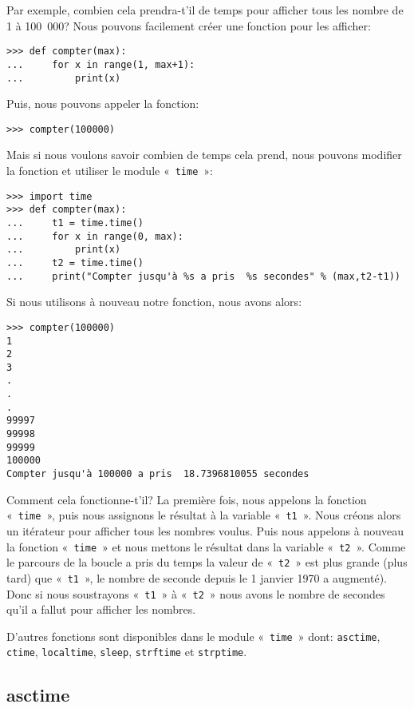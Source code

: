 Par exemple, combien cela prendra-t'il de temps pour afficher tous les nombre de 1 à 100 000?  Nous pouvons facilement créer une fonction pour les afficher:
\begin{Verbatim}[frame=single,rulecolor=\color{gray}]
>>> def compter(max):
...     for x in range(1, max+1):
...         print(x)
\end{Verbatim}

Puis, nous pouvons appeler la fonction:
\begin{Verbatim}[frame=single,rulecolor=\color{gray}]
>>> compter(100000)
\end{Verbatim}

Mais si nous voulons savoir combien de temps cela prend, nous pouvons modifier la fonction et utiliser le module  « \texttt{time} »:

\begin{Verbatim}[frame=single,rulecolor=\color{gray}]
>>> import time
>>> def compter(max):
...     t1 = time.time()
...     for x in range(0, max):
...         print(x)
...     t2 = time.time()
...     print("Compter jusqu'à %s a pris  %s secondes" % (max,t2-t1))
\end{Verbatim}

Si nous utilisons à nouveau notre fonction, nous avons alors:

\begin{Verbatim}[frame=single,rulecolor=\color{gray}]
>>> compter(100000)
1
2
3
.
.
.
99997
99998
99999
100000
Compter jusqu'à 100000 a pris  18.7396810055 secondes
\end{Verbatim}

Comment cela fonctionne-t'il? La première fois, nous appelons la fonction « \texttt{time} », puis nous assignons le résultat à la variable « \texttt{t1} ». Nous créons alors un itérateur pour afficher tous les nombres voulus. Puis nous appelons à nouveau la fonction « \texttt{time} » et nous mettons le résultat dans la variable « \texttt{t2} ». Comme le parcours de la boucle a pris du temps la valeur de « \texttt{t2} » est plus grande (plus tard) que « \texttt{t1} », le nombre de seconde depuis  le 1 janvier 1970 a augmenté). Donc si nous soustrayons « \texttt{t1} » à « \texttt{t2} » nous avons le nombre de secondes qu'il a fallut pour afficher les nombres.

D'autres fonctions sont disponibles dans le module « \texttt{time} » dont: \verb+asctime+, \verb+ctime+, \verb+localtime+, \verb+sleep+, \verb+strftime+ et \verb+strptime+.

\subsection{asctime}


